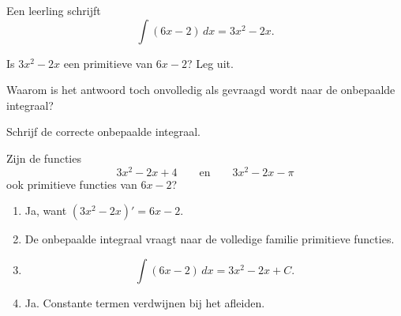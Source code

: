 \documentclass{ximera}
\begin{document}
\begin{oefening}[Waarom $+C$?]{\oefU\ESS}

Een leerling schrijft
\[
\int (6x-2)\,dx=3x^2-2x.
\]

\begin{question}
Is $3x^2-2x$ een primitieve van $6x-2$? Leg uit.
\end{question}

\begin{question}
Waarom is het antwoord toch onvolledig als gevraagd wordt naar de onbepaalde integraal?
\end{question}

\begin{question}
Schrijf de correcte onbepaalde integraal.
\end{question}

\begin{question}
Zijn de functies
\[
3x^2-2x+4
\qquad\text{en}\qquad
3x^2-2x-\pi
\]
ook primitieve functies van $6x-2$?
\end{question}

\begin{oplossing}

\begin{enumerate}
\item Ja, want $(3x^2-2x)'=6x-2$.
\item De onbepaalde integraal vraagt naar de volledige familie primitieve functies.
\item
\[
\boxed{\int(6x-2)\,dx=3x^2-2x+C.}
\]
\item Ja. Constante termen verdwijnen bij het afleiden.
\end{enumerate}

\end{oplossing}

\end{oefening}


\end{document}
